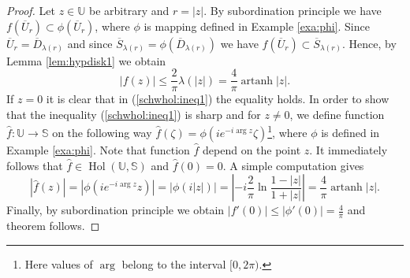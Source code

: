 \documentclass{amsart}
\newcommand{\Hol}{\mathop{\mathrm{Hol}}}
\newcommand{\artanh}{\mathop{\mathrm{artanh}}}
\begin{document}
\begin{proof}
Let $z\in\mathbb{U}$ be arbitrary and $r=|z|$. By subordination principle we have $f(\overline{U}_r)\subset\phi(\overline{U}_r)$, where $\phi$ is mapping defined in Example \ref{exa:phi}. Since
$\overline{U}_r=\overline{D}_{\lambda(r)}$ and since $\overline{S}_{\lambda(r)}=\phi(\overline{D}_{\lambda(r)})$ we have
$f(\overline{U}_r)\subset\overline{S}_{\lambda(r)}$. Hence, by Lemma \ref{lem:hypdisk1} we obtain
\begin{equation}\label{}
    |f(z)|\leqslant\frac{2}{\pi}\lambda(|z|)=\frac{4}{\pi}\artanh{|z|}.
\end{equation}
If  $z=0$ it is clear  that in  (\ref{schwhol:ineq1}) the equality holds.
In order to show that the inequality (\ref{schwhol:ineq1}) is sharp and for  $z\neq0$, we  define  function  $\widehat{f}:\mathbb{U}\rightarrow\mathbb{S}$ on the following way $\widehat{f}(\zeta)=\phi(ie^{-i\arg{z}}\zeta)$\footnote{Here values of $\arg$ belong to the interval $\displaystyle[0,2\pi)$.}, where  $\phi$ is  defined in Example \ref{exa:phi}. Note that function $\widehat{f}$ depend on the point $z$. It immediately  follows that $\widehat{f}\in\Hol(\mathbb{U},\mathbb{S})$ and  $\widehat{f}(0)=0$. A simple computation gives
\begin{equation*}
    |\widehat{f}(z)|=|\phi(ie^{-i\arg{z}}z)|=|\phi(i|z|)|=\left|-i\frac{2}{\pi}\ln\frac{1-|z|}{1+|z|}\right|=\frac{4}{\pi}\artanh{|z|}.
\end{equation*}
Finally, by subordination principle we obtain $\displaystyle|f'(0)|\leqslant|\phi'(0)|=\frac{4}{\pi}$ and theorem follows.

%
%
\end{proof}
\end{document}
